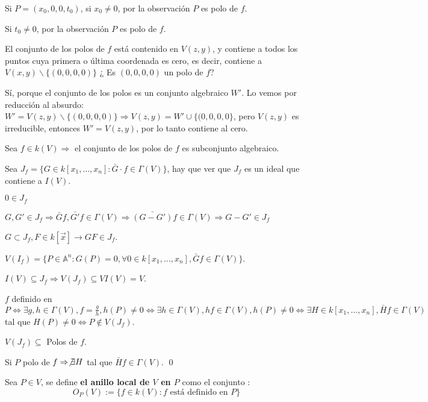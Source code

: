 Si $P=(x_0,0,0,t_0)$, si $x_0\neq 0$, por la observación $P$ es polo de $f$.

Si $t_0\neq 0$, por la observación $P$ es polo de $f$.

El conjunto de los polos de $f$ está contenido en $V(z,y)$, y contiene a todos los puntos cuya primera o última coordenada es cero, es decir, contiene a $V(x,y)\backslash \{(0,0,0,0)\}$ ¿ Es $(0,0,0,0)$ un polo de $f$?

Sí, porque el conjunto de los polos es un conjunto algebraico $W'$. Lo vemos por reducción al absurdo: $W'=V(z,y)\backslash \{(0,0,0,0)\} \Rightarrow V(z,y)=W'\cup \{(0,0,0,0\}$, pero $V(z,y)$ es irreducible, entonces $W'=V(z,y)$, por lo tanto contiene al cero.

\begin{Prop}
Sea $f\in k(V) \Rightarrow $ el conjunto de los polos de $f$ es subconjunto algebraico.
\end{Prop}

\begin{Dem}
Sea $J_f=\{ G\in k[x_1,\dots,x_n] : \bar{G}\cdot f \in \Gamma(V)\}$, hay que ver que $J_f$ es un ideal que contiene a $I(V)$. 

\begin{itemize*}
\item $0\in J_f$
\item $G,G'\in J_f \Rightarrow \bar{G}f,\bar{G'}f\in \Gamma(V) \Rightarrow \bar{(G-G')}f\in \Gamma(V) \Rightarrow G-G'\in J_f$
\item $G\subset J_f, F\in k[\vec{x}] \rightarrow GF\in J_f$.
\end{itemize*}

$V(I_f)=\{P\in \mathbb{A}^n : G(P)=0, \forall 0\in k[x_1,\dots,x_n], \bar{G}f\in \Gamma(V)\}$.

$I(V)\subseteq J_f \Rightarrow V(J_f)\subseteq VI(V)=V$.

$f$ definido en $P \Leftrightarrow  \exists g,h \in \Gamma(V), f=\frac{g}{h}, h(P)\neq 0 \Leftrightarrow \exists h\in \Gamma(V), hf \in \Gamma(V), h(P)\neq 0 \Leftrightarrow \exists H\in k[x_1,\dots,x_n], \bar{H}f\in \Gamma(V)$ tal que $H(P)\neq 0 \Leftrightarrow P\notin V(J_f)$.

$V(J_f)\subseteq$ Polos de $f$.

Si $P$ polo de $f \Rightarrow \not \exists H$ tal que $\bar{H}f\in \Gamma(V)$. \qed


\end{Dem}

\begin{Def}
Sea $P\in V$, se define \textbf{el anillo local de $V$ en $P$} como el conjunto : 
$$O_P(V):=\{f\in k(V): f\text{ está definido en } P\} $$
\end{Def}

